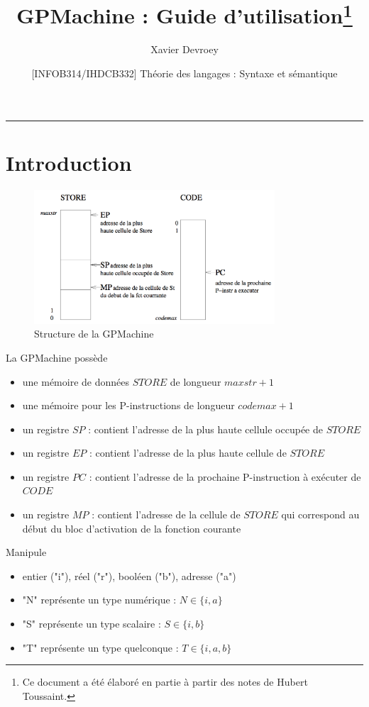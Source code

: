 \documentclass[french,11pt,twoside]{article}
\title{GPMachine : Guide d'utilisation\thanks{Ce document a été élaboré en partie à partir des notes de Hubert Toussaint.}}
\author{Xavier Devroey}
\date{[INFOB314/IHDCB332] Théorie des langages : Syntaxe et sémantique}
\begin{document}
\maketitle

\tableofcontents
\vspace{1cm}
\hrule

\section{Introduction}

\begin{figure}[h]
\centering
	\includegraphics[width=0.8\textwidth]{images/structure-PMachine}
	\caption{Structure de la GPMachine}
	\label{fig_structure_gpmachine}
\end{figure}

La GPMachine possède
\begin{itemize}
\item une mémoire de données $STORE$ de longueur $maxstr+1$
\item une mémoire pour les P-instructions de longueur $codemax+1$
\item un registre $SP$ : contient l'adresse de la plus haute cellule occupée de $STORE$
\item un registre $EP$ : contient l'adresse de la plus haute cellule de $STORE$
\item un registre $PC$ : contient l'adresse de la prochaine P-instruction à exécuter de $CODE$
\item un registre $MP$ : contient l'adresse de la cellule de $STORE$ qui correspond au début du bloc d'activation de la fonction courante
\end{itemize}


Manipule
\begin{itemize}
\item entier ("i"), réel ("r"), booléen ("b"), adresse ("a")
\item "N" représente un type numérique : $N\in\{i,a\}$
\item "S" représente un type scalaire : $S\in\{i,b\}$
\item "T" représente un type quelconque : $T\in\{i,a,b\}$
\end{itemize}
\end{document}
